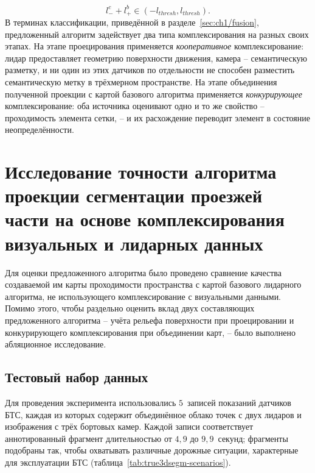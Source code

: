 \begin{equation}
	l^c_- + l^b_+ \in (-l_{thresh}, l_{thresh}).
	\label{eq:fusion_weights}
\end{equation}
В терминах классификации, приведённой в разделе~\cref{sec:ch1/fusion}, предложенный алгоритм задействует два типа комплексирования на разных своих этапах. На этапе проецирования применяется \emph{кооперативное} комплексирование: лидар предоставляет геометрию поверхности движения, камера -- семантическую разметку, и ни один из этих датчиков по отдельности не способен разместить семантическую метку в трёхмерном пространстве. На этапе объединения полученной проекции с картой базового алгоритма применяется \emph{конкурирующее} комплексирование: оба источника оценивают одно и то же свойство -- проходимость элемента сетки, -- и их расхождение переводит элемент в состояние неопределённости.

\section{Исследование точности алгоритма проекции сегментации проезжей части на основе комплексирования визуальных и лидарных данных}\label{sec:ch2/sec6}

Для оценки предложенного алгоритма было проведено сравнение качества создаваемой им карты проходимости пространства с картой базового лидарного алгоритма, не использующего комплексирование с визуальными данными. Помимо этого, чтобы раздельно оценить вклад двух составляющих предложенного алгоритма -- учёта рельефа поверхности при проецировании и конкурирующего комплексирования при объединении карт, -- было выполнено абляционное исследование.

\subsection{Тестовый набор данных}

Для проведения эксперимента использовались $5$~записей показаний датчиков БТС, каждая из которых содержит объединённое облако точек с двух лидаров и изображения с трёх бортовых камер. Каждой записи соответствует аннотированный фрагмент длительностью от $4,9$ до $9,9$~секунд; фрагменты подобраны так, чтобы охватывать различные дорожные ситуации, характерные для эксплуатации БТС (таблица~\cref{tab:true3dsegm-scenarios}).

